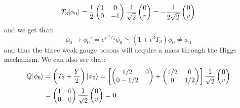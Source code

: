 \begin{equation}
  \label{eq:163}
  \begin{aligned}[t]
    T_3 |\phi_0\rangle & = \frac{1}{2}
    \begin{pmatrix}
      1 & 0 \\
      0 & -1
    \end{pmatrix}
    \frac{1}{\sqrt{2}}
    \begin{pmatrix}
      0 \\
      v
    \end{pmatrix}
    = - \frac{1}{2 \sqrt{2}}
    \begin{pmatrix}
      0 \\
      v
    \end{pmatrix} \\
  \end{aligned}
\end{equation}
and we get that:
\begin{equation}
  \label{eq:164}
  \phi_0 \rightarrow \phi_0' = e^{i \epsilon^3 T_3} \phi_0 \simeq \left( 1 +
    \epsilon^3 T_3 \right) \phi_0 \neq \phi_0
\end{equation}
and thus the three weak gauge bosons will acquire a mass through the Higgs
mechanism. We can also see that:
\begin{equation}
  \label{eq:165}
  \begin{aligned}
    Q |\phi_0\rangle & = \left( T_3 + \frac{Y}{2} \right) |\phi_0\rangle = \left[
      \begin{pmatrix}
        1/2 & 0 \\
        0 - 1/2
      \end{pmatrix}
      +
      \begin{pmatrix}
        1/2 & 0 \\
        0 & 1/2
      \end{pmatrix}
    \right] \frac{1}{\sqrt{2}}
    \begin{pmatrix}
      0 \\
      v
    \end{pmatrix} \\
    & =
    \begin{pmatrix}
      1 & 0 \\
      0 & 0
    \end{pmatrix}
    \frac{1}{\sqrt{2}}
    \begin{pmatrix}
      0 \\
      v
    \end{pmatrix} = 0
  \end{aligned}
\end{equation}
